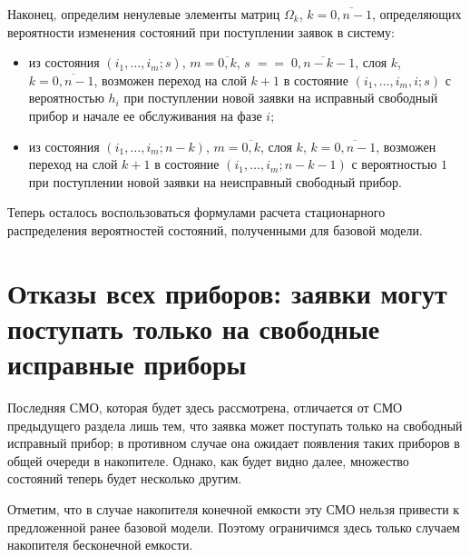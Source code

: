 \begin{multicols}{2}
Наконец, определим ненулевые элементы мат\-риц
$\Omega_k$, $k=\overline{0,n-1}$, определяющих вероятности
изменения состояний при поступлении заявок в систему:
\begin{itemize}
\item из состояния
$(i_1,\ldots,i_m;s)$, $m=\overline{0,k}$, $s\;=$\linebreak $=\;\overline{0,n-k-1}$,
слоя $k$, $k=\overline{0,n-1}$, возможен переход на слой $k+1$
в состояние $(i_1,\ldots,i_m,i;s)$ с вероятностью $h_{i}$
при поступлении новой заявки на исправный свободный прибор и начале ее
обслуживания на фазе $i$;
\item
из состояния
$(i_1,\ldots,i_m;n-k)$, $m=\overline{0,k}$,
слоя $k$, $k=\overline{0,n-1}$, возможен переход на слой $k+1$
в состояние $(i_1,\ldots,i_m;n-k-1)$ с вероятностью $1$ при
поступлении новой заявки на неисправный свободный прибор.   %
\end{itemize}

Теперь осталось воспользоваться формулами расчета стационарного
распределения вероятностей состояний, полученными для базовой
модели.


\section{Отказы всех приборов: заявки могут поступать только
на свободные исправные приборы}

Последняя СМО, которая будет здесь рас\-смот\-ре\-на, отличается от СМО
предыдущего раздела лишь тем, что заявка может поступать только
на свободный исправный прибор; в противном случае она ожидает появления
таких приборов в общей очереди в накопителе.
Однако, как будет видно далее, множество состояний теперь будет
несколько другим.

Отметим, что в случае накопителя конечной емкости эту СМО нельзя
привести к предложенной ранее базовой модели.
Поэтому ограничимся здесь только случаем накопителя бесконечной
емкости.


\end{multicols}
